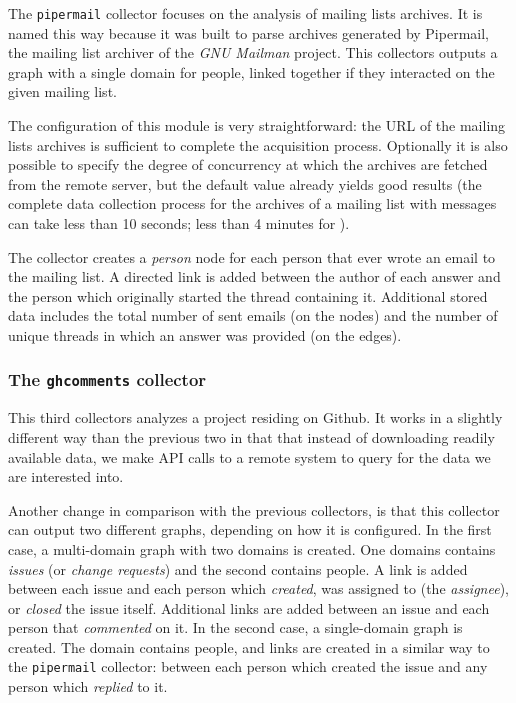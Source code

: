 The \texttt{pipermail} collector focuses on the analysis of mailing lists archives. It is named this way because it was built to parse archives generated by Pipermail, the mailing list archiver of the \emph{GNU Mailman} project. This collectors outputs a graph with a single domain for people, linked together if they interacted on the given mailing list.

The configuration of this module is very straightforward: the URL of the mailing lists archives is sufficient to complete the acquisition process. Optionally it is also possible to specify the degree of concurrency at which the archives are fetched from the remote server, but the default value already yields good results (the complete data collection process for the archives of a mailing list with  messages can take less than 10 seconds; less than 4 minutes for ).

The collector creates a \emph{person} node for each person that ever wrote an email to the mailing list. A directed link is added between the author of each answer and the person which originally started the thread containing it. Additional stored data includes the total number of sent emails (on the nodes) and the number of unique threads in which an answer was provided (on the edges).

\subsubsection{The \texttt{ghcomments} collector}

This third collectors analyzes a project residing on Github. It works in a slightly different way than the previous two in that that instead of downloading readily available data, we make API calls to a remote system to query for the data we are interested into.

Another change in comparison with the previous collectors, is that this collector can output two different graphs, depending on how it is configured. In the first case, a multi-domain graph with two domains is created. One domains contains \emph{issues} (or \emph{change requests}) and the second contains people. A link is added between each issue and each person which \emph{created}, was assigned to (the \emph{assignee}), or \emph{closed} the issue itself. Additional links are added between an issue and each person that \emph{commented} on it. In the second case, a single-domain graph is created. The domain contains people, and links are created in a similar way to the \texttt{pipermail} collector: between each person which created the issue and any person which \emph{replied} to it.

